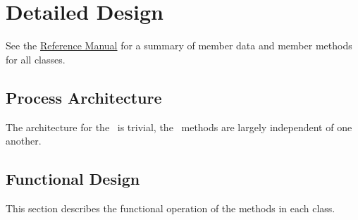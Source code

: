 
%
%
% 
%

\section{Detailed Design}
See the \href{file:refman.pdf}{Reference Manual}\cite{derivedstatebib:ReferenceManual} for a summary of member data and member methods for all classes.  

\subsection{Process Architecture}
The architecture for the \NEDDesc\ is trivial, the \NEDDesc\ methods are largely independent of one another.

\subsection{Functional Design}
This section describes the functional operation of the methods in each class.

